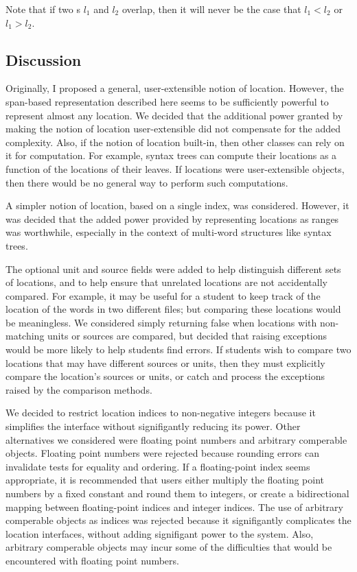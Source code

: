 \documentclass[11pt]{article}
\begin{document}
  \noindent
  Note that if two s $l_1$ and $l_2$ overlap, then it
  will never be the case that $l_1<l_2$ or $l_1>l_2$.

  \subsection{Discussion}

  Originally, I proposed a general, user-extensible notion of
  location.  However, the span-based representation described here
  seems to be sufficiently powerful to represent almost any location.
  We decided that the additional power granted by making the notion of
  location user-extensible did not compensate for the added
  complexity.  Also, if the notion of location built-in, then other
  classes can rely on it for computation.  For example, syntax trees
  can compute their locations as a function of the locations of their
  leaves.  If locations were user-extensible objects, then there would
  be no general way to perform such computations.

  A simpler notion of location, based on a single index, was
  considered.  However, it was decided that the added power provided
  by representing locations as ranges was worthwhile, especially in
  the context of multi-word structures like syntax trees.

  The optional unit and source fields were added to help distinguish
  different sets of locations, and to help ensure that unrelated
  locations are not accidentally compared.  For example, it may be
  useful for a student to keep track of the location of the words in
  two different files; but comparing these locations would be
  meaningless.  We considered simply returning false when locations
  with non-matching units or sources are compared, but decided that
  raising exceptions would be more likely to help students find
  errors.  If students wish to compare two locations that may have
  different sources or units, then they must explicitly compare the
  location's sources or units, or catch and process the exceptions
  raised by the comparison methods.

  We decided to restrict location indices to non-negative integers
  because it simplifies the interface without signifigantly reducing
  its power.  Other alternatives we considered were floating point
  numbers and arbitrary comperable objects.  Floating point numbers
  were rejected because rounding errors can invalidate tests for
  equality and ordering.  If a floating-point index seems appropriate,
  it is recommended that users either multiply the floating point
  numbers by a fixed constant and round them to integers, or create a
  bidirectional mapping between floating-point indices and integer
  indices.  The use of arbitrary comperable objects as indices was
  rejected because it signifigantly complicates the location
  interfaces, without adding signifigant power to the system.  Also,
  arbitrary comperable objects may incur some of the difficulties that
  would be encountered with floating point numbers.
\end{document}
